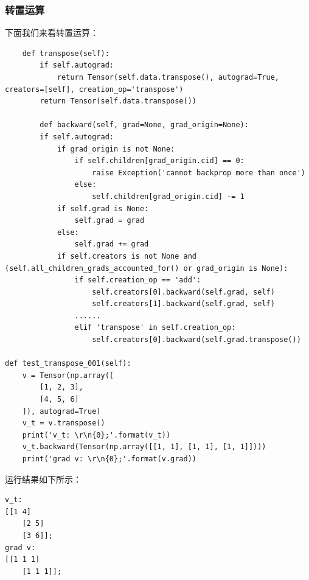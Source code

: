 \subsubsection{转置运算}
下面我们来看转置运算：
\begin{lstlisting}
    def transpose(self):
        if self.autograd:
            return Tensor(self.data.transpose(), autograd=True, creators=[self], creation_op='transpose')
		return Tensor(self.data.transpose())
		
		def backward(self, grad=None, grad_origin=None):
        if self.autograd:
            if grad_origin is not None:
                if self.children[grad_origin.cid] == 0:
                    raise Exception('cannot backprop more than once')
                else:
                    self.children[grad_origin.cid] -= 1
            if self.grad is None:
                self.grad = grad
            else:
                self.grad += grad
            if self.creators is not None and (self.all_children_grads_accounted_for() or grad_origin is None):
                if self.creation_op == 'add':
                    self.creators[0].backward(self.grad, self)
					self.creators[1].backward(self.grad, self)
				......
                elif 'transpose' in self.creation_op:
					self.creators[0].backward(self.grad.transpose())
					
def test_transpose_001(self):
	v = Tensor(np.array([
		[1, 2, 3],
		[4, 5, 6]
	]), autograd=True)
	v_t = v.transpose()
	print('v_t: \r\n{0};'.format(v_t))
	v_t.backward(Tensor(np.array([[1, 1], [1, 1], [1, 1]])))
	print('grad v: \r\n{0};'.format(v.grad))
\end{lstlisting}
运行结果如下所示：
\begin{lstlisting}
v_t:
[[1 4]
	[2 5]
	[3 6]];
grad v:
[[1 1 1]
	[1 1 1]];
\end{lstlisting}
